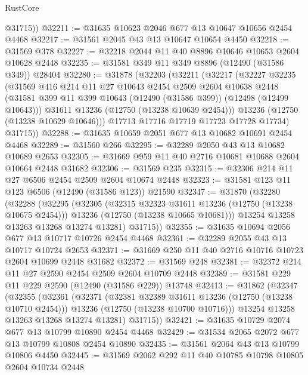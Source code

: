 \begin{lexlean}{RustCore}
\begin{coremodule}
        @31715))
@32211 := @31635 @10623 @2046 @677 @13 @10647 @10656 @2454 @4468
@32217 := @31561 @2045 @43 @13 @10647 @10654 @4450
@32218 := @31569 @378
@32227 := @32218 @2044 @11 @40 @8896 @10646 @10653 @2604 @10628 @2448
@32235 := @31581 @349 @11 @349 @8896 (@12490 (@31586 @349)) @28404
@32280 := @31878
    (@32203
      (@32211
        (@32217
          (@32227
            @32235
            (@31569
              @416
              @214
              @11
              @27
              @10643
              @2454
              @2509
              @2604
              @10638
              @2448
              (@31581 @399 @11 @399 @10643 (@12490 (@31586 @399)) (@12498 (@12499 @10643)))
              @31611
              @13236
              (@12750 (@13238 @10639 @2454)))
            @13236
            (@12750 (@13238 @10629 @10646)))
          @17713
          @17716
          @17719
          @17723
          @17728
          @17734)
        @31715))
@32288 := @31635 @10659 @2051 @677 @13 @10682 @10691 @2454 @4468
@32289 := @31560 @266
@32295 := @32289 @2050 @43 @13 @10682 @10689 @2653
@32305 := @31669 @959 @11 @40 @2716 @10681 @10688 @2604 @10664 @2448 @31682
@32306 := @31569 @235
@32315 := @32306 @214 @11 @27 @6506 @2454 @2509 @2604 @10674 @2448
@32323 := @31581 @123 @11 @123 @6506 (@12490 (@31586 @123)) @21590
@32347 := @31870
    (@32280
      (@32288
        (@32295
          (@32305
            (@32315 @32323 @31611 @13236 (@12750 (@13238 @10675 @2454)))
            @13236
            (@12750 (@13238 @10665 @10681)))
          @13254
          @13258
          @13263
          @13268
          @13274
          @13281)
        @31715))
@32355 := @31635 @10694 @2056 @677 @13 @10717 @10726 @2454 @4468
@32361 := @32289 @2055 @43 @13 @10717 @10724 @2653
@32371 := @31669 @250 @11 @40 @2716 @10716 @10723 @2604 @10699 @2448 @31682
@32372 := @31569 @248
@32381 := @32372 @214 @11 @27 @2590 @2454 @2509 @2604 @10709 @2448
@32389 := @31581 @229 @11 @229 @2590 (@12490 (@31586 @229)) @13748
@32413 := @31862
    (@32347
      (@32355
        (@32361
          (@32371
            (@32381 @32389 @31611 @13236 (@12750 (@13238 @10710 @2454)))
            @13236
            (@12750 (@13238 @10700 @10716)))
          @13254
          @13258
          @13263
          @13268
          @13274
          @13281)
        @31715))
@32421 := @31635 @10729 @2074 @677 @13 @10799 @10890 @2454 @4468
@32429 := @31534 @2065 @2072 @677 @13 @10799 @10808 @2454 @10890
@32435 := @31561 @2064 @43 @13 @10799 @10806 @4450
@32445 := @31569 @2062 @292 @11 @40 @10785 @10798 @10805 @2604 @10734 @2448

\end{coremodule}
\end{lexlean}
